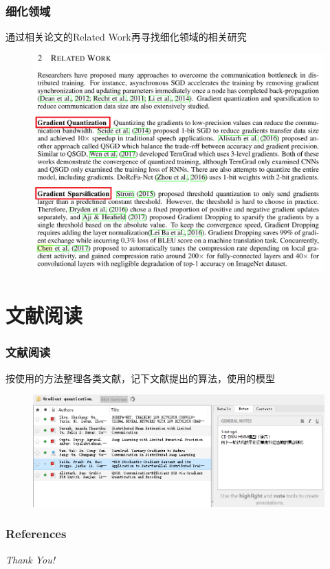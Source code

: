 \documentclass[hyperref={pdfpagelabels=false}]{beamer}
\begin{document}
\begin{frame}
	\frametitle{细化领域}
	通过相关论文的Related Work再寻找细化领域的相关研究
	\begin{figure}
		\centering
		\includegraphics[height=0.8\textheight]{./figure/5.png}
	\end{figure}
\end{frame}

\section{文献阅读}
\begin{frame}
	\tableofcontents[currentsection]
\end{frame} 


\begin{frame}
	\frametitle{文献阅读}
	按使用的方法整理各类文献，记下文献提出的算法，使用的模型
	\begin{figure}
		\centering
		\includegraphics[height=0.5\textheight]{./figure/6.png}
	\end{figure}
\end{frame}


\begin{frame}[allowframebreaks]
	\frametitle{References}
	
	
\end{frame}

\begin{frame}{}
	\centering \Huge
	\emph{Thank You!}
\end{frame} 
\end{document}

